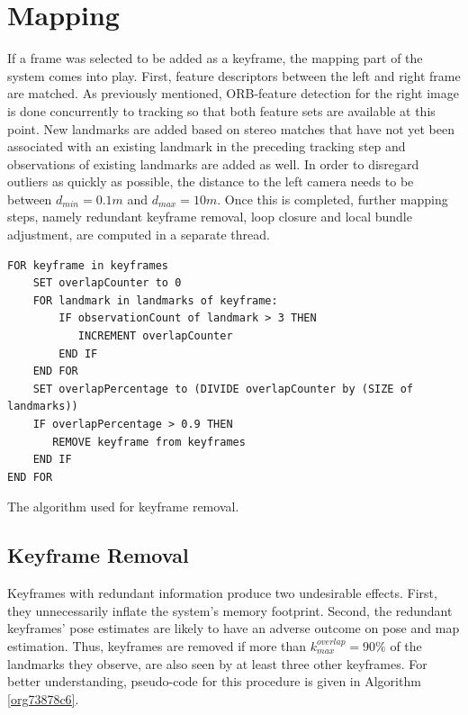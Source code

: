 \documentclass[a4paper, 10pt]{article}
\begin{document}
\section{Mapping}
\label{sec:org2256c6f}
If a frame was selected to be added as a keyframe, the mapping part of the system comes into play. First, feature descriptors between the left and right frame are matched. 
As previously mentioned, ORB-feature detection for the right image is done concurrently to tracking so that both feature sets are available at this point. 
New landmarks are added based on stereo matches that have not yet been associated with an existing landmark in the preceding tracking step and observations of existing landmarks are added as well. 
In order to disregard outliers as quickly as possible, the distance to the left camera needs to be between \(d_{min}=0.1m\) and \(d_{max}=10m\).
Once this is completed, further mapping steps, namely redundant keyframe removal, loop closure and local bundle adjustment, are computed in a separate thread.


\begin{listing}[th]
\begin{verbatim}
FOR keyframe in keyframes
    SET overlapCounter to 0
    FOR landmark in landmarks of keyframe:
        IF observationCount of landmark > 3 THEN
           INCREMENT overlapCounter
        END IF
    END FOR
    SET overlapPercentage to (DIVIDE overlapCounter by (SIZE of landmarks))
    IF overlapPercentage > 0.9 THEN
       REMOVE keyframe from keyframes
    END IF
END FOR
\end{verbatim}
\caption{\label{org73878c6}
The algorithm used for keyframe removal.}
\end{listing}

\subsection{Keyframe Removal}
\label{sec:org6c416c6}
Keyframes with redundant information produce two undesirable effects. First, they unnecessarily inflate the system’s memory footprint. Second, the redundant keyframes' pose estimates are 
likely to have an adverse outcome on pose and map estimation.
Thus, keyframes are removed if more than \(k_{max}^{overlap}=90\%\) of the landmarks they observe, are also seen by at least three other keyframes. For better understanding, pseudo-code for this procedure 
is given in Algorithm \ref{org73878c6}.
\end{document}
